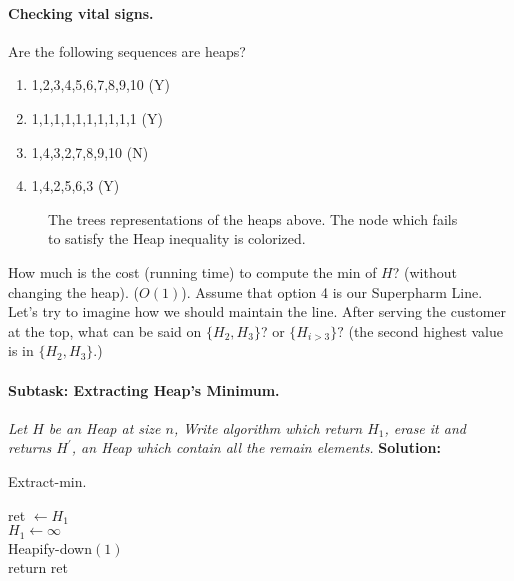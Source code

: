 \paragraph{Checking vital signs.}Are the following sequences are heaps? 
\begin{enumerate}
  \item 1,2,3,4,5,6,7,8,9,10 (Y)
  \item 1,1,1,1,1,1,1,1,1,1  (Y)
  \item 1,4,3,2,7,8,9,10     (N)
  \item 1,4,2,5,6,3	     (Y)
\end{enumerate}
\begin{figure}[h]
  \centering
  \begin{subfigure}[b]{0.3\textwidth}
	
  \end{subfigure}
\begin{subfigure}[b]{0.3\textwidth}
	
  \end{subfigure}
\begin{subfigure}[b]{0.3\textwidth}
	
  \end{subfigure}
  \caption{The trees representations of the heaps above. The node which fails to satisfy the Heap inequality is colorized.}
\end{figure}
How much is the cost (running time) to compute the min of $H$? (without changing the heap). ($O\left( 1 \right)$). Assume that option 4 is our Superpharm Line. Let's try to imagine how we should maintain the line. After serving the customer at the top, what can be said on $ \{ H_{2}, H_{3}\}$? or $\{H_{i>3}\}?$ (the second highest value is in $\{H_{2}, H_{3} \}$.)   
\paragraph{Subtask: Extracting Heap's Minimum.} \textit{Let $H$ be an Heap at size $n$, Write algorithm which return $H_1$, erase it and returns $H^\prime$, an Heap which contain all the remain elements.} 
\textbf{Solution:} 

\begin{algbox}{Extract-min.}
\begin{algorithm}[H]
ret $\leftarrow H_{1} $ \\
$ H_{1} \leftarrow \infty $  \\
Heapify-down$\left( 1 \right)$ \\
return ret  
\end{algorithm}
\end{algbox}



